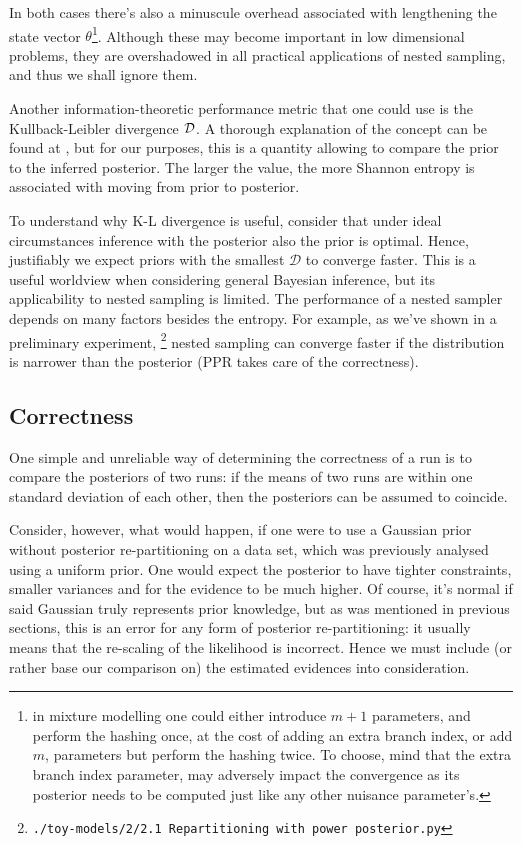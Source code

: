 \documentclass[usenatbib]{mnras}
\begin{document}
In both cases there's also a minuscule overhead associated with
lengthening the state vector \(\theta\)\footnote{in mixture modelling one could either introduce \(m+1\)
parameters, and perform the hashing once, at the cost of adding an
extra branch index, or add \(m\), parameters but perform the hashing
twice. To choose, mind that the extra branch index parameter, may
adversely impact the convergence as its posterior needs to be computed
just like any other nuisance parameter's.}.  Although these may
become important in low dimensional problems, they are overshadowed
in all practical applications of nested sampling, and thus we shall
ignore them.

Another information-theoretic performance metric that one could use
is the Kullback-Leibler divergence \({\cal D}\). A thorough
explanation of the concept can be found at \cite{Kullback_1951}, but
for our purposes, this is a quantity allowing to compare the prior
to the inferred posterior. The larger the value, the more Shannon
entropy is associated with moving from prior to posterior. 

To understand why K-L divergence is useful, consider that under
ideal circumstances inference with the posterior also the prior is
optimal. Hence, justifiably we expect priors with the smallest
\(\mathcal{D}\) to converge faster. This is a useful worldview when
considering general Bayesian inference, but its applicability to
nested sampling is limited. The performance of a nested sampler
depends on many factors besides the entropy. For example, as we've
shown in a preliminary experiment, \footnote{\texttt{./toy-models/2/2.1 Repartitioning with power posterior.py}} nested sampling can
converge faster if the distribution is narrower than the posterior
(PPR takes care of the correctness). 



\subsection{Correctness}
\label{sec:orge22967a}
One simple and unreliable way of determining the correctness of a
run is to compare the posteriors of two runs: if the means of two
runs are within one standard deviation of each other, then the
posteriors can be assumed to coincide.

Consider, however, what would happen, if one were to use a Gaussian
prior without posterior re-partitioning on a data set, which was
previously analysed using a uniform prior. One would expect the
posterior to have tighter constraints, smaller variances and for
the evidence to be much higher. Of course, it's normal if said
Gaussian truly represents prior knowledge, but as was mentioned in
previous sections, this is an error for any form of posterior
re-partitioning: it usually means that the re-scaling of the
likelihood is incorrect. Hence we must include (or rather base our
comparison on) the estimated evidences into consideration.
\end{document}
